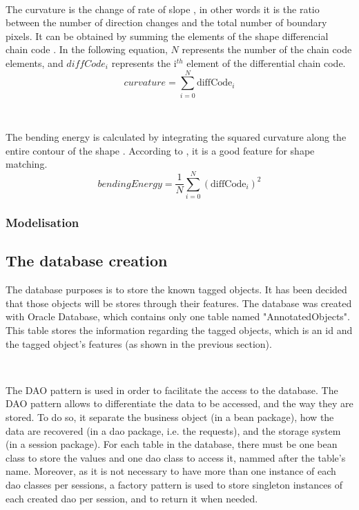 ~~ 

The curvature is the change of rate of slope \cite{bib:chain:ObjectDescription}, in other words it is the ratio between the number of direction changes and the total number of boundary pixels. It can be obtained by summing the elements of the shape differencial chain code  \cite{bib:chain:ShapeRepresentationDescription}. In the following equation, $N$ represents the number of the chain code elements, and $diffCode_i$ represents the i$^{th}$ element of the differential chain code. 
\begin{equation}
curvature = \sum_{i = 0}^{N} \text{diffCode}_i
\end{equation}


~~

The bending energy is calculated by integrating the squared curvature along the entire contour of the shape \cite{bib:chain:ShapeRepresentationDescription}. According to \cite{bib:chain:ShapeDescriptionLesson}, it is a good feature for shape matching. 
\begin{equation}
bendingEnergy = \frac{1}{N} \sum_{i = 0}^{N} (\text{diffCode}_i)^{2}
\end{equation}


\subsubsection{Modelisation}










\subsection{The database creation}

The database purposes is to store the known tagged objects. It has been decided that those objects will be stores through their features. The database was created with Oracle Database, which contains only one table named "AnnotatedObjects". This table stores the information regarding the tagged objects, which is an id and the tagged object's features (as shown in the previous section).

~~

The \gls{DAO} pattern is used in order to facilitate the access to the database. The \gls{DAO} pattern allows to differentiate the data to be accessed, and the way they are stored. To do so, it separate the business object (in a bean package), how the data are recovered (in a dao package, i.e. the requests), and the storage system (in a session package). For each table in the database, there must be one bean class to store the values and one dao class to access it, nammed after the table's name. Moreover, as it is not necessary to have more than one instance of each dao classes per sessions, a factory pattern is used to store singleton instances of each created dao per session, and to return it when needed.

